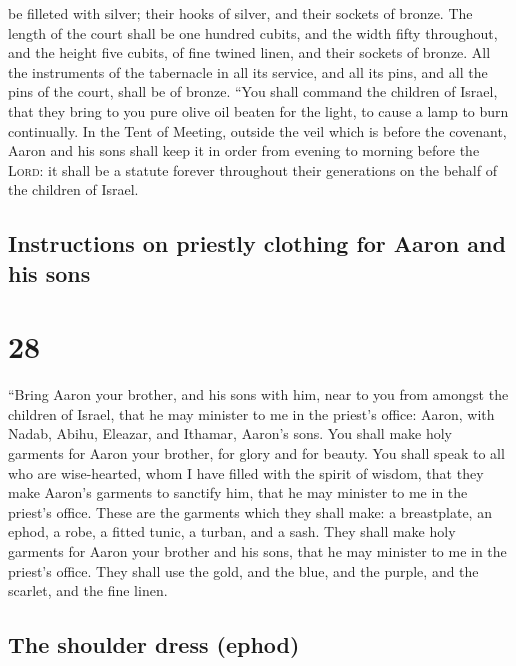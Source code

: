 be filleted with silver; their hooks of silver, and their sockets of
bronze.  The length of the court shall be one hundred
cubits, and the width fifty throughout, and the height five cubits, of
fine twined linen, and their sockets of bronze.  All the
instruments of the tabernacle in all its service, and all its pins, and
all the pins of the court, shall be of bronze.  ``You
shall command the children of Israel, that they bring to you pure olive
oil beaten for the light, to cause a lamp to burn continually.
 In the Tent of Meeting, outside the veil which is before
the covenant, Aaron and his sons shall keep it in order from evening to
morning before the \textsc{Lord}: it shall be a statute forever
throughout their generations on the behalf of the children of Israel.

\hypertarget{instructions-on-priestly-clothing-for-aaron-and-his-sons}{%
\subsection{Instructions on priestly clothing for Aaron and his
sons}\label{instructions-on-priestly-clothing-for-aaron-and-his-sons}}

\hypertarget{section-27}{%
\section{28}\label{section-27}}

 ``Bring Aaron your brother, and his sons with him, near
to you from amongst the children of Israel, that he may minister to me
in the priest's office: Aaron, with Nadab, Abihu, Eleazar, and Ithamar,
Aaron's sons.  You shall make holy garments for Aaron your
brother, for glory and for beauty.  You shall speak to all
who are wise-hearted, whom I have filled with the spirit of wisdom, that
they make Aaron's garments to sanctify him, that he may minister to me
in the priest's office.  These are the garments which they
shall make: a breastplate, an ephod, a robe, a fitted tunic, a turban,
and a sash. They shall make holy garments for Aaron your brother and his
sons, that he may minister to me in the priest's office. 
They shall use the gold, and the blue, and the purple, and the scarlet,
and the fine linen.

\hypertarget{the-shoulder-dress-ephod}{%
\subsection{The shoulder dress (ephod)}\label{the-shoulder-dress-ephod}}

